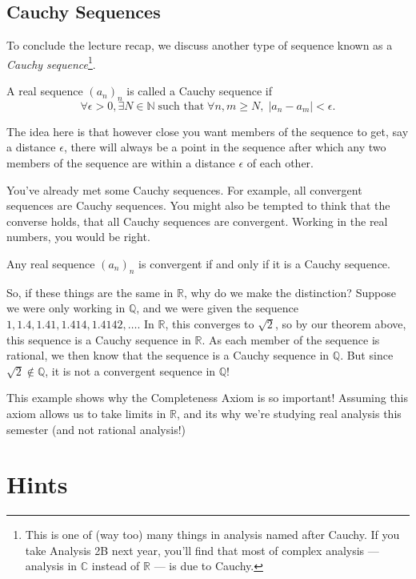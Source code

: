 \documentclass[
  10pt,
  a4paper]{article}
\theoremstyle{plain}
\theoremstyle{plain}
\theoremstyle{plain}
\theoremstyle{plain}
\theoremstyle{plain}
\theoremstyle{definition}
\theoremstyle{definition}
\theoremstyle{definition}
\theoremstyle{remark}
\let\BeginKnitrBlock\begin \let\EndKnitrBlock\end
\begin{document}
\hypertarget{cauchy-sequences}{%
\subsection{Cauchy Sequences}\label{cauchy-sequences}}

To conclude the lecture recap, we discuss another type of sequence known as a \emph{Cauchy sequence}\footnote{This is one of (way too) many things in analysis named after Cauchy. If you take Analysis 2B next year, you'll find that most of complex analysis --- analysis in \(\mathbb{C}\) instead of \(\mathbb{R}\) --- is due to Cauchy.}.

\BeginKnitrBlock{definition}[Cauchy Sequence]
{\label{def:def2} }A real sequence \((a_n)_n\) is called a Cauchy sequence if \[\forall \epsilon >0, \exists N \in \mathbb{N} \; \text{such that} \; \forall n,m \geq N, \; \lvert a_n - a_m\rvert < \epsilon.\]
\EndKnitrBlock{definition}
The idea here is that however close you want members of the sequence to get, say a distance \(\epsilon\), there will always be a point in the sequence after which any two members of the sequence are within a distance \(\epsilon\) of each other.

You've already met some Cauchy sequences. For example, all convergent sequences are Cauchy sequences. You might also be tempted to think that the converse holds, that all Cauchy sequences are convergent. Working in the real numbers, you would be right.

\BeginKnitrBlock{theorem}
{\label{thm:thm3} }Any real sequence \((a_n)_n\) is convergent if and only if it is a Cauchy sequence.
\EndKnitrBlock{theorem}
So, if these things are the same in \(\mathbb{R}\), why do we make the distinction? Suppose we were only working in \(\mathbb{Q}\), and we were given the sequence \(1,1.4,1.41,1.414,1.4142,\ldots\). In \(\mathbb{R}\), this converges to \(\sqrt{2}\), so by our theorem above, this sequence is a Cauchy sequence in \(\mathbb{R}\). As each member of the sequence is rational, we then know that the sequence is a Cauchy sequence in \(\mathbb{Q}\). But since \(\sqrt{2} \not\in \mathbb{Q}\), it is not a convergent sequence in \(\mathbb{Q}\)!

This example shows why the Completeness Axiom is so important! Assuming this axiom allows us to take limits in \(\mathbb{R}\), and its why we're studying real analysis this semester (and not rational analysis!)

\hypertarget{hints}{%
\section{Hints}\label{hints}}
\end{document}
